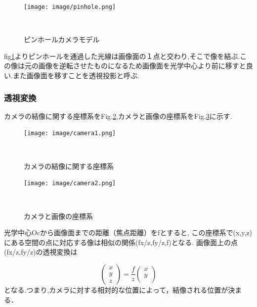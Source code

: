 \documentclass[a4paper]{jarticle}
\begin{document}
\begin{figure}[htbp]
 \begin{center}
  \texttt{[image: image/pinhole.png]}
 　\caption{ピンホールカメラモデル}%
 　\label{fig:02}%
 \end{center}
\end{figure}

fig\ref{fig:02}よりピンホールを通過した光線は画像面の１点と交わり,そこで像を結ぶ.この像は元の画像を逆転させたものになるため画像面を光学中心より前に移すと良い.また画像面を移すことを透視投影と呼ぶ.

\subsubsection{透視変換}
カメラの結像に関する座標系をFig.\ref{fig:03},カメラと画像の座標系をFig.\ref{fig:04}に示す.

\begin{figure}[htbp]
 \begin{center}
  \texttt{[image: image/camera1.png]}
 　\caption{カメラの結像に関する座標系}%
 　\label{fig:03}%
 \end{center}
\end{figure}

\begin{figure}[htbp]
 \begin{center}
  \texttt{[image: image/camera2.png]}
 　\caption{カメラと画像の座標系}%
 　\label{fig:04}%
 \end{center}
\end{figure}

光学中心Ocから画像面までの距離（焦点距離）をfとすると,
この座標系で(x,y,z)にある空間の点に対応する像は相似の関係(fx/z,fy/z,f)となる.
画像面上の点(fx/z,fy/z)の透視変換は

\begin{equation}
\left(
    \begin{array}{c}
      x \\
      y \\
      z 
    \end{array}
  \right)=\frac{f}{z} \left(
    \begin{array}{c}
      x \\
      y \\
       
    \end{array}
  \right)
\end{equation}
となる.つまり,カメラに対する相対的な位置によって，結像される位置が決まる．
\end{document}
